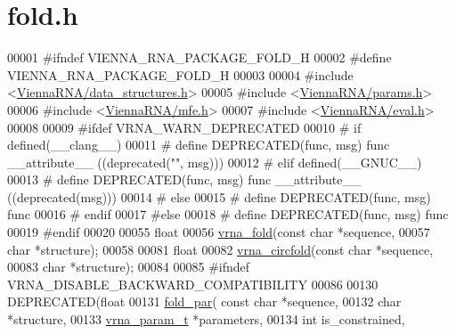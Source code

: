\hypertarget{fold_8h_source}{}\section{fold.\+h}
\label{fold_8h_source}

\begin{DoxyCode}
00001 \textcolor{preprocessor}{#ifndef VIENNA\_RNA\_PACKAGE\_FOLD\_H}
00002 \textcolor{preprocessor}{#define VIENNA\_RNA\_PACKAGE\_FOLD\_H}
00003 
00004 \textcolor{preprocessor}{#include <\hyperlink{data__structures_8h}{ViennaRNA/data\_structures.h}>}
00005 \textcolor{preprocessor}{#include <\hyperlink{params_8h}{ViennaRNA/params.h}>}
00006 \textcolor{preprocessor}{#include <\hyperlink{mfe_8h}{ViennaRNA/mfe.h}>}
00007 \textcolor{preprocessor}{#include <\hyperlink{eval_8h}{ViennaRNA/eval.h}>}
00008 
00009 \textcolor{preprocessor}{#ifdef VRNA\_WARN\_DEPRECATED}
00010 \textcolor{preprocessor}{# if defined(\_\_clang\_\_)}
00011 \textcolor{preprocessor}{#  define DEPRECATED(func, msg) func \_\_attribute\_\_ ((deprecated("", msg)))}
00012 \textcolor{preprocessor}{# elif defined(\_\_GNUC\_\_)}
00013 \textcolor{preprocessor}{#  define DEPRECATED(func, msg) func \_\_attribute\_\_ ((deprecated(msg)))}
00014 \textcolor{preprocessor}{# else}
00015 \textcolor{preprocessor}{#  define DEPRECATED(func, msg) func}
00016 \textcolor{preprocessor}{# endif}
00017 \textcolor{preprocessor}{#else}
00018 \textcolor{preprocessor}{# define DEPRECATED(func, msg) func}
00019 \textcolor{preprocessor}{#endif}
00020 
00055 \textcolor{keywordtype}{float}
00056 \hyperlink{group__mfe__fold__single_ga29a33b2895f4e67b0480271ff289afdc}{vrna\_fold}(\textcolor{keyword}{const} \textcolor{keywordtype}{char} *sequence,
00057           \textcolor{keywordtype}{char} *structure);
00058 
00081 \textcolor{keywordtype}{float}
00082 \hyperlink{group__mfe__fold__single_gaf973483d8acbc8cc9aacfc8a9b7f0074}{vrna\_circfold}(\textcolor{keyword}{const} \textcolor{keywordtype}{char} *sequence,
00083               \textcolor{keywordtype}{char} *structure);
00084 
00085 \textcolor{preprocessor}{#ifndef VRNA\_DISABLE\_BACKWARD\_COMPATIBILITY}
00086 
00130 DEPRECATED(\textcolor{keywordtype}{float}
00131 \hyperlink{group__mfe__fold__single_ga2bc41df5d71fee6fd8da9904ee65d8fb}{fold\_par}( \textcolor{keyword}{const} \textcolor{keywordtype}{char} *sequence,
00132           \textcolor{keywordtype}{char} *structure,
00133           \hyperlink{group__energy__parameters_structvrna__param__s}{vrna\_param\_t} *parameters,
00134           \textcolor{keywordtype}{int} is\_constrained,

\end{DoxyCode}
